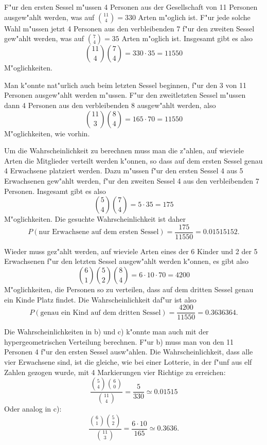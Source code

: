 \begin{loesung}
\begin{teilaufgaben}
\item F"ur den ersten Sessel m"ussen 4 Personen aus der Gesellschaft
von 11 Personen ausgew"ahlt werden, was auf $\binom{11}{4}=330$
Arten m"oglich ist. F"ur jede solche Wahl m"ussen jetzt 4 Personen
aus den verbleibenden 7 f"ur den zweiten Sessel gew"ahlt werden,
was auf $\binom{7}{4}=35$ Arten m"oglich ist. Insgesamt gibt es
also 
\[
\binom{11}{4}\binom{7}{4}=330\cdot 35=11550
\]
M"oglichkeiten.

Man k"onnte nat"urlich auch beim letzten Sessel beginnen, f"ur
den 3 von 11 Personen ausgew"ahlt werden m"ussen. F"ur den 
zweitletzten Sessel m"ussen dann 4 Personen aus den verbleibenden
8 ausgew"ahlt werden, also 
\[
\binom{11}{3}\binom{8}{4}=165\cdot 70=11550
\]
M"oglichkeiten, wie vorhin.
\item
Um die Wahrscheinlichkeit zu berechnen muss man die z"ahlen, auf
wieviele Arten die Mitglieder verteilt werden k"onnen, so dass
auf dem ersten Sessel genau 4 Erwachsene platziert werden.
Dazu m"ussen f"ur den ersten Sessel 4 aus 5 Erwachsenen gew"ahlt werden,
f"ur den zweiten Sessel 4 aus den verbleibenden 7 Personen. Insgesamt
gibt es also
\[
\binom{5}{4}\binom{7}{4}=5\cdot 35=175
\]
M"oglichkeiten. Die gesuchte Wahrscheinlichkeit ist daher
\[
P(\text{nur Erwachsene auf dem ersten Sessel})=
\frac{175}{11550}=0.01515152.
\]
\item
Wieder muss gez"ahlt werden, auf wieviele Arten eines der 6 Kinder
und 2 der 5 Erwachsenen 
f"ur
den letzten Sessel ausgew"ahlt werden k"onnen, es gibt also
\[
\binom{6}{1}\binom{5}{2}\binom{8}{4}=6\cdot 10\cdot70=4200
\]
M"oglichkeiten, die Personen so zu verteilen, dass auf dem dritten
Sessel genau ein Kinde Platz findet. Die Wahrscheinlichkeit daf"ur ist
also
\[
P(\text{genau ein Kind auf dem dritten Sessel})=\frac{4200}{11550}=0.3636364.
\]
\end{teilaufgaben}
Die Wahrscheinlichkeiten in b) und c) k"onnte man auch mit der
hypergeometrischen Verteilung berechnen. F"ur b) muss man von
den 11 Personen 4 f"ur den ersten Sessel ausw"ahlen.
Die Wahrscheinlichkeit,
dass alle vier Erwachsene sind, ist
die gleiche, wie bei einer Lotterie, in der f"unf aus elf Zahlen gezogen wurde,
mit 4 Markierungen vier Richtige zu erreichen:
\[
\frac{
\binom{5}{4}\binom{6}{0}
}{
\binom{11}{4}
}
=\frac{5}{330}\simeq 0.01515
\]
Oder analog in c):
\[
\frac{
\binom{6}{1}\binom{5}{2}
}{
\binom{11}{3}
}
=\frac{6\cdot 10}{165}\simeq 0.3636.
\]
\end{loesung}
